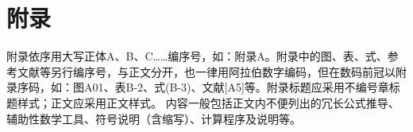 

\chapter{附\quad 录}
附录依序用大写正体A、B、C……编序号，如：附录A。附录中的图、表、式、参考文献等另行编序号，与正文分开，也一律用阿拉伯数字编码，但在数码前冠以附录序码，如：图A01、表B-2、式(B-3)、文献[A5]等。附录标题应采用不编号章标题样式；正文应采用正文样式。
内容一般包括正文内不便列出的冗长公式推导、辅助性数学工具、符号说明（含缩写）、计算程序及说明等。



